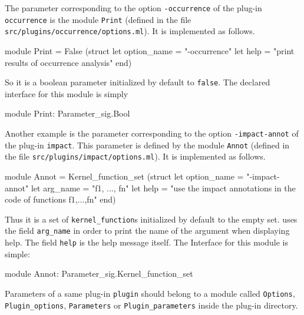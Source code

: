 \begin{example}
  The parameter corresponding to the option \texttt{-occurrence} of the plug-in
  \texttt{occurrence} is the module \texttt{Print} (defined in the file
  \texttt{src/plugins/occurrence/options.ml}). It is implemented as follows.
\begin{ocamlcode}
module Print =
  False
    (struct
       let option_name = "-occurrence"
       let help = "print results of occurrence analysis"
     end)
\end{ocamlcode}
So it is a boolean parameter initialized by default to
\texttt{false}. The declared interface for this module is simply
\begin{ocamlcode}
module Print: Parameter_sig.Bool
\end{ocamlcode}

Another example is the parameter corresponding to the option
\texttt{-impact-annot} of the plug-in \texttt{impact}. This parameter is
defined by the module \texttt{Annot} (defined in the file
\texttt{src/plugins/impact/options.ml}). It is implemented as follows.
\begin{ocamlcode}
module Annot =
  Kernel_function_set
    (struct
       let option_name = "-impact-annot"
       let arg_name = "f1, ..., fn"
       let help = "use the impact annotations in the code of functions f1,...,fn"
     end)
\end{ocamlcode}
Thus it is a set of \texttt{kernel\_function}s initialized by default to
the empty set. \framac uses
the field \texttt{arg\_name} in order to print the name of the argument when
displaying help. The field \texttt{help} is the help message itself. The
Interface for this module is simple:
\begin{ocamlcode}
module Annot: Parameter_sig.Kernel_function_set
\end{ocamlcode}
\end{example}

\begin{convention}
Parameters of a same plug-in \texttt{plugin} should belong to a module called
\texttt{Options}, \texttt{Plugin\_options}, \texttt{Parameters} or
\texttt{Plugin\_parameters} inside the plug-in directory.
\end{convention}


